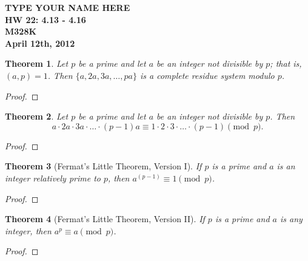 \documentclass[12pt,leqno]{article}
\numberwithin{equation}{section}
\newtheorem{thm}{Theorem}[section]
\theoremstyle{definition}
\begin{document}
\thispagestyle{plain}
\begin{flushright}
\large{\textbf{TYPE YOUR NAME HERE \\
HW 22: 4.13 - 4.16\\
M328K \\
April 12th, 2012 \\}}
\end{flushright}

\markboth{}{} \setcounter{section}{0} \baselineskip=18pt

\setcounter{tocdepth}{4}



\setcounter{section}{4}

\setcounter{thm}{12}


\begin{thm}
Let $p$ be a prime and let $a$ be an integer not divisible by $p$;
that is, $(a, p) = 1$.  Then $\{a, 2a, 3a, \hdots, pa\}$ is a
complete residue system modulo $p$.
\end{thm}
\begin{proof}[Proof]
\end{proof}


\begin{thm}
Let $p$ be a prime and let $a$ be an integer not divisible by $p$.
Then
\[a \cdot 2a \cdot 3a \cdot \hdots \cdot (p-1)a \equiv
    1 \cdot 2 \cdot 3 \cdot \hdots \cdot (p-1) \pmod{p}.\]
\end{thm}
\begin{proof}[Proof]
\end{proof}


\begin{thm}[Fermat's Little Theorem, Version I]
If $p$ is a prime and $a$ is an integer relatively prime to $p$,
then $a^{(p-1)} \equiv 1 \pmod{p}$.
\end{thm}
\begin{proof}[Proof]
\end{proof}

\begin{thm}[Fermat's Little Theorem, Version II]
If $p$ is a prime and $a$ is \emph{any} integer, then $a^p \equiv a
\pmod{p}$.
\end{thm}
\begin{proof}[Proof]
\end{proof}
\end{document}
